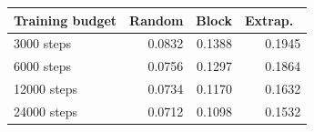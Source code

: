 \small
\begin{tabular}{lrrr}\toprule
Training budget & Random & Block & Extrap.\ \\\midrule
3000 steps & 0.0832 & 0.1388 & 0.1945 \\
6000 steps & 0.0756 & 0.1297 & 0.1864 \\
12000 steps & 0.0734 & 0.1170 & 0.1632 \\
24000 steps & 0.0712 & 0.1098 & 0.1532 \\
\bottomrule\end{tabular}
